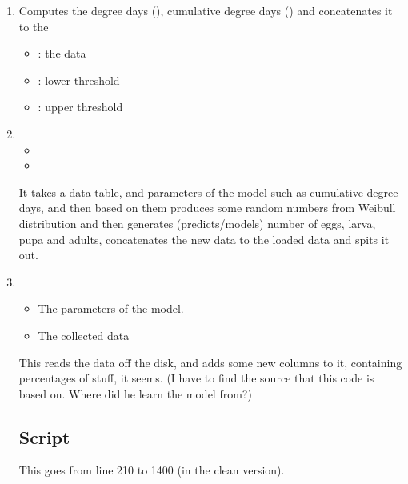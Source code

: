 \begin{enumerate}
\item {}

Computes the degree days (), cumulative degree days () and concatenates it to the 

\begin{itemize}
\item {}: the data
\item {}: lower threshold
\item {}: upper threshold
\end{itemize}

 

\item {}

\begin{itemize}
\item {}

\item {}
\end{itemize}

It takes a data table, and parameters of the model such as cumulative 
degree days, and then
based on them produces some random numbers from Weibull
distribution and then generates (predicts/models) number of eggs,
larva, pupa and adults, concatenates the new data to the loaded data
and spits it out.

\item {}

\begin{itemize}
\item {} The parameters of the model.
\item {} The collected data
\end{itemize}

 This reads the data off the disk, and adds some
new columns to it, containing percentages of stuff, it seems. (I have to find the source
that this code is based on. Where did he learn the model from?)

\subsection{Script}
This goes from line 210 to 1400 (in the clean version).
\end{enumerate}

